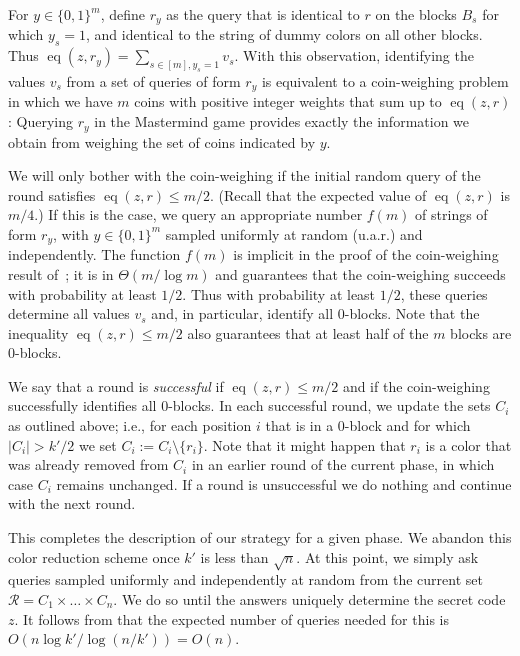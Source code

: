\documentclass[english,a4paper,11pt]{article}
\newcommand{\cR}{{\mathcal{R}}}
\DeclareMathOperator{\eq}{eq}
\newcommand{\ifLongCites}[2]{#1}
\newcommand{\ifLongCites}[2]{#2}
\begin{document}
{For $y \in \{0,1\}^m$, define $r_y$ as the query that is identical to $r$ on the blocks $B_s$ for which $y_s = 1$, and identical to the string of dummy colors on all other blocks. Thus $\eq(z,r_y) = \sum_{s \in [m], y_s = 1} v_s$. With this observation, identifying the values $v_s$ from a set of queries of form $r_y$ is equivalent to a coin-weighing problem in which we have $m$ coins with positive integer weights that sum up to $\eq(z,r)$: Querying $r_y$ in the Mastermind game provides exactly the information we obtain from weighing the set of coins indicated by $y$.

We will only bother with the coin-weighing if the initial random query of the round satisfies $\eq(z,r)\leq m/2$. (Recall that the expected value of $\eq(z,r)$ is $m/4$.) If this is the case, we query an appropriate number $f(m)$ of strings of form $r_y$, with $y\in\{0,1\}^m$ sampled uniformly at random (u.a.r.) and independently. The function $f(m)$ is implicit in the proof of the coin-weighing result of~\cite{grebinski-journal}; it is in $\Theta(m/\log m)$ and guarantees that the coin-weighing succeeds with probability at least $1/2$. Thus with probability at least $1/2$, these queries determine all values $v_s$ and, in particular, identify all $0$-blocks. Note that the inequality $\eq(z,r)\leq m/2$ also guarantees that at least half of the $m$ blocks are $0$-blocks.

We say that a round is \emph{successful} if $\eq(z,r) \leq m/2$ and if the coin-weighing successfully identifies all $0$-blocks. In each successful round, we update the sets $C_i$ as outlined above; i.e., for each position $i$ that is in a $0$-block and for which $|C_i|>k'/2$ we set $C_i:=C_i\setminus\{r_i\}$. Note that it might happen that $r_i$ is a color that was already removed from $C_i$ in an earlier round of the current phase, in which case $C_i$ remains unchanged.
If a round is unsuccessful we do nothing and continue with the next round.

This completes the description of our strategy for a given phase. We abandon this color reduction scheme once $k'$ is less than $\sqrt{n}$. At this point, we simply ask queries sampled uniformly and independently at random from the current set $\cR=C_1 \times \dots \times C_n$. We do so until the answers uniquely determine the secret code $z$. %
It follows from \ifLongCites{\cite{Chvatal83}}{Chv\'atal's result~\cite{Chvatal83}} that the expected number of queries needed for this is $O(n \log k' /  \log (n/k'))= O(n)$.

}
\end{document}

